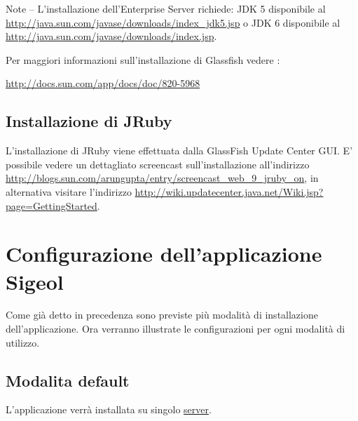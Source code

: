 \documentclass[11pt,a4paper]{article}
\begin{document}
Note – L'installazione dell'Enterprise Server richiede:
JDK 5 disponibile al \url{http://java.sun.com/javase/downloads/index_jdk5.jsp} o 
JDK 6 disponibile al \url{http://java.sun.com/javase/downloads/index.jsp}. 

\bigskip
Per maggiori informazioni sull'installazione di Glassfish vedere : 

\url{http://docs.sun.com/app/docs/doc/820-5968}


\subsection{Installazione di JRuby}

L'installazione di JRuby viene effettuata dalla GlassFish Update Center GUI.
E' possibile vedere un dettagliato screencast sull'installazione all'indirizzo  \url{http://blogs.sun.com/arungupta/entry/screencast_web_9_jruby_on}, in alternativa visitare l'indirizzo \url{http://wiki.updatecenter.java.net/Wiki.jsp?page=GettingStarted}.

\newpage
\section{Configurazione dell'applicazione Sigeol}
Come già detto in precedenza sono previste più modalità di installazione dell'applicazione.
Ora verranno illustrate le configurazioni per ogni modalità di utilizzo.
\subsection{Modalita default}
L'applicazione verrà installata su singolo \underline{server}.
\end{document}
